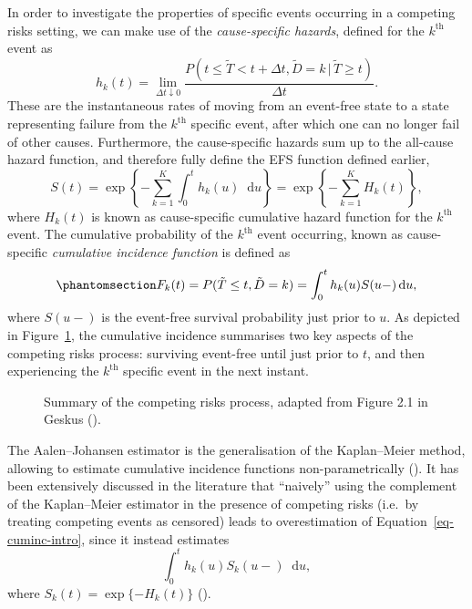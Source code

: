 \documentclass[
  letterpaper,
  DIV=11,
  numbers=noendperiod]{scrreprt}
\newcommand{\given}{\,|\,}
\newcommand\diff{\mathop{}\!\mathrm{d}}
\begin{document}
In order to investigate the properties of specific events occurring in a
competing risks setting, we can make use of the \emph{cause-specific
hazards}, defined for the \(k^{\text{th}}\) event as\\
\[
    h_k(t) = \lim_{\Delta t \downarrow 0} \frac{P(t \leq \tilde{T} < t + \Delta t, \tilde{D} = k \given \tilde{T} \geq t)}{\Delta t}.
\] These are the instantaneous rates of moving from an event-free state
to a state representing failure from the \(k^{\text{th}}\) specific
event, after which one can no longer fail of other causes. Furthermore,
the cause-specific hazards sum up to the all-cause hazard function, and
therefore fully define the EFS function defined earlier, \[
S(t) = \exp \left\{ - \sum_{k = 1}^{K} \int_{0}^{t} h_k(u)\diff u \right\} = \exp \left\{ - \sum_{k = 1}^{K} H_k(t) \right\},
\] where \(H_k(t)\) is known as cause-specific cumulative hazard
function for the \(k^{\text{th}}\) event. The cumulative probability of
the \(k^{\text{th}}\) event occurring, known as cause-specific
\emph{cumulative incidence function} is defined as
\begin{equation}\phantomsection\label{eq-cuminc-intro}{
    F_k(t) = P(\tilde{T} \leq t, \tilde{D} = k) = \int_{0}^{t}h_k(u)S(u-)\diff u,
}\end{equation} where \(S(u-)\) is the event-free survival probability
just prior to \(u\). As depicted in Figure~\ref{fig-diag-geskus}, the
cumulative incidence summarises two key aspects of the competing risks
process: surviving event-free until just prior to \(t\), and then
experiencing the \(k^{\text{th}}\) specific event in the next instant.

\begin{figure}


\caption{\label{fig-diag-geskus}Summary of the competing risks process,
adapted from Figure 2.1 in Geskus
().}

\end{figure}%

The Aalen--Johansen estimator is the generalisation of the Kaplan--Meier
method, allowing to estimate cumulative incidence functions
non-parametrically
(). It has been extensively discussed in the literature that
``naively'' using the complement of the Kaplan--Meier estimator in the
presence of competing risks (i.e.~by treating competing events as
censored) leads to overestimation of Equation~\ref{eq-cuminc-intro},
since it instead estimates \[
\int_{0}^{t}h_k(u)S_k(u-)\diff u,
\] where \(S_k(t) = \exp\{-H_k(t)\}\)
().
\end{document}
